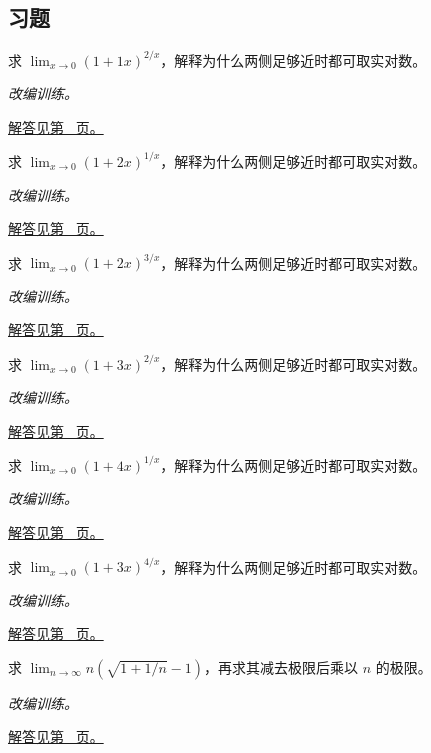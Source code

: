 \documentclass[UTF8,12pt,a4paper,fontset=fandol]{ctexart}
\begin{document}
\subsection{习题}
\begin{example}[幂指型函数极限]\label{ex:c5q1}
求 $\displaystyle\lim_{x\to0}(1+1x)^{2/x}$，解释为什么两侧足够近时都可取实对数。
\par\textit{改编训练。}\par\hyperref[ans:c5q1]{解答见第~\pageref{ans:c5q1} 页。}
\end{example}
\begin{example}[幂指型函数极限]\label{ex:c5q2}
求 $\displaystyle\lim_{x\to0}(1+2x)^{1/x}$，解释为什么两侧足够近时都可取实对数。
\par\textit{改编训练。}\par\hyperref[ans:c5q2]{解答见第~\pageref{ans:c5q2} 页。}
\end{example}
\begin{example}[幂指型函数极限]\label{ex:c5q3}
求 $\displaystyle\lim_{x\to0}(1+2x)^{3/x}$，解释为什么两侧足够近时都可取实对数。
\par\textit{改编训练。}\par\hyperref[ans:c5q3]{解答见第~\pageref{ans:c5q3} 页。}
\end{example}
\begin{example}[幂指型函数极限]\label{ex:c5q4}
求 $\displaystyle\lim_{x\to0}(1+3x)^{2/x}$，解释为什么两侧足够近时都可取实对数。
\par\textit{改编训练。}\par\hyperref[ans:c5q4]{解答见第~\pageref{ans:c5q4} 页。}
\end{example}
\begin{example}[幂指型函数极限]\label{ex:c5q5}
求 $\displaystyle\lim_{x\to0}(1+4x)^{1/x}$，解释为什么两侧足够近时都可取实对数。
\par\textit{改编训练。}\par\hyperref[ans:c5q5]{解答见第~\pageref{ans:c5q5} 页。}
\end{example}
\begin{example}[幂指型函数极限]\label{ex:c5q6}
求 $\displaystyle\lim_{x\to0}(1+3x)^{4/x}$，解释为什么两侧足够近时都可取实对数。
\par\textit{改编训练。}\par\hyperref[ans:c5q6]{解答见第~\pageref{ans:c5q6} 页。}
\end{example}
\begin{example}[缩放后的根式增量]\label{ex:c5q7}
求 $\displaystyle\lim_{n\to\infty}n\left(\sqrt{1+1/n}-1\right)$，再求其减去极限后乘以 $n$ 的极限。
\par\textit{改编训练。}\par\hyperref[ans:c5q7]{解答见第~\pageref{ans:c5q7} 页。}
\end{example}
\end{document}
